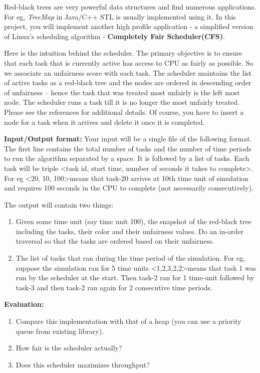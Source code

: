 \documentclass[12pt]{article}
\begin{document}
Red-black trees are very powerful data structures and find numerous applications. For eg, {\em TreeMap} in Java/C++ STL is usually implemented using it. In this project, you will implement another high profile application - a simplified version of Linux's scheduling algorithm -  {\bf Completely Fair Scheduler(CFS)}. 

Here is the intuition behind the scheduler. The primary objective is to ensure that each task that is currently active has access to CPU as fairly as possible. So we associate an unfairness score with each task. The scheduler maintains the list of active tasks as a red-black tree and the nodes are ordered in descending order of unfairness – hence the task that was treated most unfairly is the left most node. The  scheduler runs a task till it is no longer the most unfairly treated. Please see the references for additional details. Of course, you have to insert a node for a task when it arrives and delete it once it is completed. 

{\bf Input/Output format:}  Your input will be a single file of the following format. The first line contains the total number of tasks and the number of time periods to run the algorithm  separated by a space. It is followed by a list of tasks. Each task will be triple \textless       task id, start time, number of seconds it takes to complete\textgreater.  For eg \textless20, 10, 100\textgreater means that task-20 arrives at 10th time unit of simulation and requires 100 seconds in the CPU to complete (not necessarily consecutively). 

The output will contain two things: 
\begin{enumerate}
\item Given some time unit (say time unit 100), the snapshot of the red-black tree including the tasks, their color and their unfairness values. Do an in-order traversal so that the tasks are ordered based on their unfairness. 
\item The list of tasks that ran during the time period of the simulation. For eg, suppose the simulation ran for 5 time units \textless       1,2,3,2,2\textgreater means that  task 1 was run by the scheduler at the start. Then task-2 ran for 1 time-unit followed by task-3 and then task-2 ran again for 2 consecutive time periods. 
\end{enumerate}

{\bf Evaluation:}
\begin{enumerate} 
\item Compare this implementation with that of a heap (you can use a priority queue from existing library).
\item How fair is the scheduler actually?
\item Does this scheduler maximizes throughput?
\end{enumerate}
\end{document}

